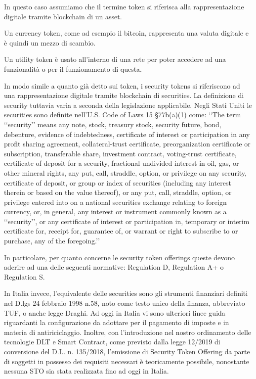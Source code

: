 In questo caso assumiamo che il termine token si riferisca alla rappresentazione digitale tramite blockchain di un asset.

Un currency token, come ad esempio il bitcoin, rappresenta una valuta digitale e è quindi un mezzo di scambio.

Un utility token è usato all'interno di una rete per poter accedere ad una funzionalità o per il funzionamento di questa. 

In modo simile a quanto già detto sui token, i security tokens si riferiscono ad una rappresentazione digitale tramite blockchain di securities. La definizione di security tuttavia varia a seconda della legislazione applicabile.
Negli Stati Uniti le securities sono definite nell'U.S. Code of Laws 15 §77b(a)(1) come:
‘‘The term ‘‘security’’ means any note, stock, treasury stock, security future, bond, debenture, evidence of indebtedness, certificate of interest or participation in any profit sharing agreement, collateral-trust certificate, preorganization certificate or subscription, transferable share, investment
contract, voting-trust certificate, certificate of deposit for a security, fractional undivided interest in oil, gas, or other mineral rights, any put, call, straddle, option, or privilege on any security, certificate of deposit, or group or index of securities (including any interest therein or based on the value thereof), or any put, call, straddle, option, or privilege entered into on a national securities exchange relating to foreign currency, or, in general, any interest or instrument commonly known as a ‘‘security’’, or any certificate of interest or participation in, temporary or interim certificate for, receipt for, guarantee of, or warrant or right to subscribe to or purchase, any of the foregoing.’’

In particolare, per quanto concerne le security token offerings queste devono aderire ad una delle seguenti normative: Regulation D, Regulation A+ o Regulation S\cite{K31,K32,k33}. 

In Italia invece, l'equivalente delle securities sono gli strumenti finanziari definiti nel D.lgs 24 febbraio 1998 n.58, noto come testo unico della finanza, abbreviato TUF, o anche legge Draghi\cite{K34}. Ad oggi in Italia vi sono ulteriori linee guida riguardanti la configurazione da adottare per il pagamento di imposte e in materia di antiriciclaggio. Inoltre, con l'introduzione nel nostro ordinamento delle tecnologie DLT e Smart Contract, come previsto dalla legge 12/2019 di conversione del D.L. n. 135/2018, l'emissione di Security Token Offering da parte di soggetti in possesso dei requisiti necessari è teoricamente possibile, nonostante nessuna STO sia stata realizzata fino ad oggi in Italia.

